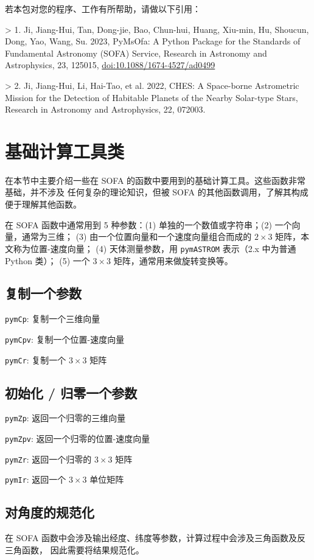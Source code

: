 \documentclass[11pt]{article}
\begin{document}
若本包对您的程序、工作有所帮助，请做以下引用：

> 1. Ji, Jiang-Hui, Tan, Dong-jie, Bao, Chun-hui, Huang, Xiu-min, Hu, Shoucun,
Dong, Yao, Wang, Su. 2023, PyMsOfa: A Python Package for the Standards of
Fundamental Astronomy (SOFA) Service, Research in Astronomy and Astrophysics, 23,
125015, \href{https://doi.org/10.1088/1674-4527/ad0499}{doi:10.1088/1674-4527/ad0499}

> 2. Ji, Jiang-Hui, Li, Hai-Tao, et al. 2022, CHES: A Space-borne Astrometric
Mission for the Detection of Habitable Planets of the Nearby Solar-type Stars,
Research in Astronomy and Astrophysics, 22, 072003.

\newpage
\section{基础计算工具类}
在本节中主要介绍一些在 SOFA 的函数中要用到的基础计算工具。这些函数非常基础，并不涉及
任何复杂的理论知识，但被 SOFA 的其他函数调用，了解其构成便于理解其他函数。

在 SOFA 函数中通常用到 5 种参数：(1) 单独的一个数值或字符串；(2) 一个向量，通常为三维；
(3) 由一个位置向量和一个速度向量组合而成的 $2\times3$ 矩阵，本文称为位置-速度向量；
(4) 天体测量参数，用 \texttt{pymASTROM} 表示（2.x 中为普通 Python 类）；
(5) 一个 $3\times3$ 矩阵，通常用来做旋转变换等。

\subsection{复制一个参数}
\texttt{pymCp}: 复制一个三维向量

\texttt{pymCpv}: 复制一个位置-速度向量

\texttt{pymCr}: 复制一个 $3\times3$ 矩阵

\subsection{初始化 / 归零一个参数}
\texttt{pymZp}: 返回一个归零的三维向量

\texttt{pymZpv}: 返回一个归零的位置-速度向量

\texttt{pymZr}: 返回一个归零的 $3\times3$ 矩阵

\texttt{pymIr}: 返回一个 $3\times3$ 单位矩阵

\subsection{对角度的规范化}
在 SOFA 函数中会涉及输出经度、纬度等参数，计算过程中会涉及三角函数及反三角函数，
因此需要将结果规范化。
\end{document}
